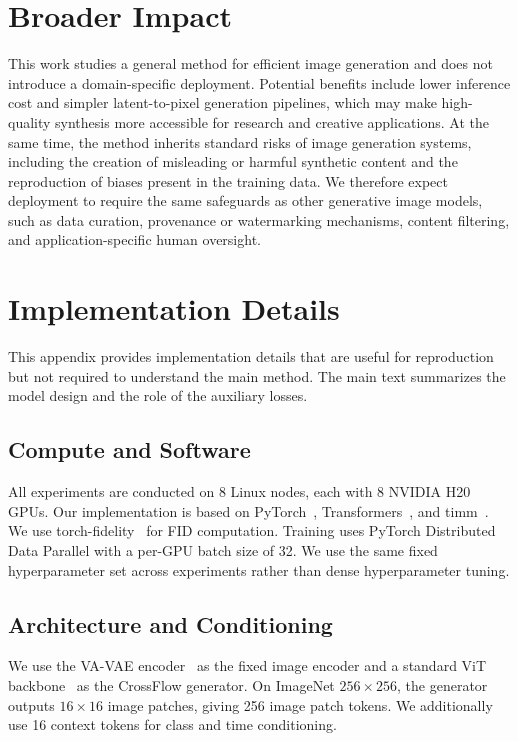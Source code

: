 \newpage

\section{Broader Impact}

This work studies a general method for efficient image generation and does not introduce a domain-specific deployment. Potential benefits include lower inference cost and simpler latent-to-pixel generation pipelines, which may make high-quality synthesis more accessible for research and creative applications. At the same time, the method inherits standard risks of image generation systems, including the creation of misleading or harmful synthetic content and the reproduction of biases present in the training data. We therefore expect deployment to require the same safeguards as other generative image models, such as data curation, provenance or watermarking mechanisms, content filtering, and application-specific human oversight.

\section{Implementation Details}
\label{app:implementation_details}

This appendix provides implementation details that are useful for reproduction but not required to understand the main method. The main text summarizes the model design and the role of the auxiliary losses.

\subsection{Compute and Software}

All experiments are conducted on 8 Linux nodes, each with 8 NVIDIA H20 GPUs. Our implementation is based on PyTorch~\citep{pytorch}, Transformers~\citep{transformers_lib}, and timm~\citep{timm_lib}. We use torch-fidelity~\citep{torch_fid_lib} for FID computation. Training uses PyTorch Distributed Data Parallel with a per-GPU batch size of 32. We use the same fixed hyperparameter set across experiments rather than dense hyperparameter tuning.

\subsection{Architecture and Conditioning}

We use the VA-VAE encoder~\citep{VAVAE} as the fixed image encoder and a standard ViT backbone~\citep{ViT} as the CrossFlow generator. On ImageNet $256\times256$, the generator outputs $16\times16$ image patches, giving 256 image patch tokens. We additionally use 16 context tokens for class and time conditioning.

